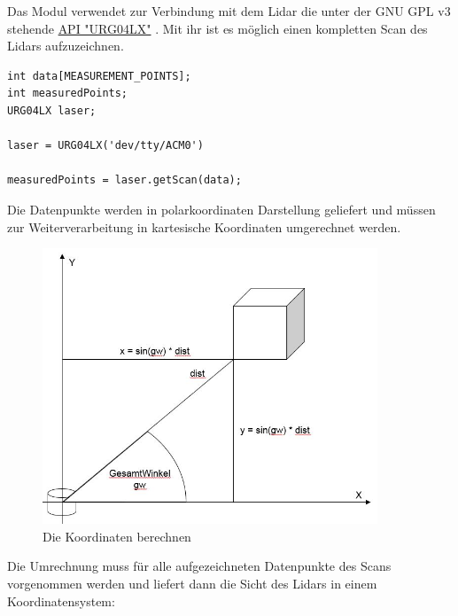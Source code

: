 Das Modul verwendet zur Verbindung mit dem Lidar die unter der GNU GPL v3 stehende \href{https://github.com/simondlevy/BreezyLidar}{API "URG04LX"} \cite{breezylidar.2018}. Mit ihr ist es möglich einen kompletten Scan des Lidars aufzuzeichnen. 
\vspace{0.4cm}

\begin{lstlisting}
int data[MEASUREMENT_POINTS]; 
int measuredPoints;
URG04LX laser;

laser = URG04LX('dev/tty/ACM0')

measuredPoints = laser.getScan(data);

\end{lstlisting}
\vspace{-0.6cm}

Die Datenpunkte werden in polarkoordinaten Darstellung geliefert und müssen zur Weiterverarbeitung in kartesische Koordinaten umgerechnet werden. 

\begin{figure}[h]
\begin{center}
\includegraphics[width=10cm]{images/chapter5/LidarKoordRechnung.JPG}
\caption{Die Koordinaten berechnen}
\label{Koordinaten_errechnen}
\end{center}
\end{figure}

Die Umrechnung muss für alle aufgezeichneten Datenpunkte des Scans vorgenommen werden und liefert dann die Sicht des Lidars in einem Koordinatensystem:

